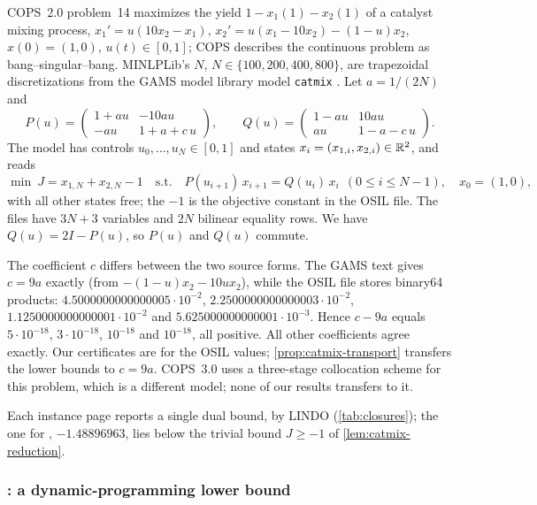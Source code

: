 COPS~2.0 problem~14 maximizes the yield $1 - x_1(1) - x_2(1)$ of a catalyst mixing process, $x_1' = u(10x_2 - x_1)$, $x_2' = u(x_1 - 10x_2) - (1-u)x_2$, $x(0) = (1,0)$, $u(t)\in[0,1]$; COPS describes the continuous problem as bang--singular--bang.
MINLPLib's $N$, $N\in\{100,200,400,800\}$, are trapezoidal discretizations from the GAMS model library model \texttt{catmix} \citep{library2026-cops-and-gams-source-models}.
Let $a = 1/(2N)$ and
\[
P(u) = \begin{pmatrix} 1 + a u & -10 a u\\ -a u & 1 + a + c\,u \end{pmatrix},\qquad
Q(u) = \begin{pmatrix} 1 - a u & 10 a u\\ a u & 1 - a - c\,u \end{pmatrix}.
\]
The model has controls $u_0,\dots,u_N \in [0,1]$ and states $x_i = (x_{1,i}, x_{2,i}) \in \mathbb{R}^2$, and reads
\begin{equation}\label{eq:catmix-model}
\min\ J = x_{1,N} + x_{2,N} - 1\quad\text{s.t.}\quad P(u_{i+1})\,x_{i+1} = Q(u_i)\,x_i\ \ (0 \le i \le N-1),\quad x_0 = (1,0),
\end{equation}
with all other states free; the $-1$ is the objective constant in the OSIL file.
The files have $3N+3$ variables and $2N$ bilinear equality rows.
We have $Q(u) = 2I - P(u)$, so $P(u)$ and $Q(u)$ commute.

The coefficient $c$ differs between the two source forms.
The GAMS text gives $c = 9a$ exactly (from $-(1-u)x_2 - 10ux_2$), while the OSIL file stores binary64 products: $4.5000000000000005\cdot10^{-2}$, $2.2500000000000003\cdot10^{-2}$, $1.1250000000000001\cdot10^{-2}$ and $5.625000000000001\cdot10^{-3}$.
Hence $c - 9a$ equals $5\cdot10^{-18}$, $3\cdot10^{-18}$, $10^{-18}$ and $10^{-18}$, all positive.
All other coefficients agree exactly.
Our certificates are for the OSIL values; \cref{prop:catmix-transport} transfers the lower bounds to $c = 9a$.
COPS~3.0 uses a three-stage collocation scheme for this problem, which is a different model; none of our results transfers to it.

Each instance page reports a single dual bound, by LINDO (\cref{tab:closures}); the one for , $-1.48896963$, lies below the trivial bound $J \ge -1$ of \cref{lem:catmix-reduction}.

\subsubsection{\texorpdfstring{}{catmix}: a dynamic-programming lower bound}\label{app:catmix-dp}

